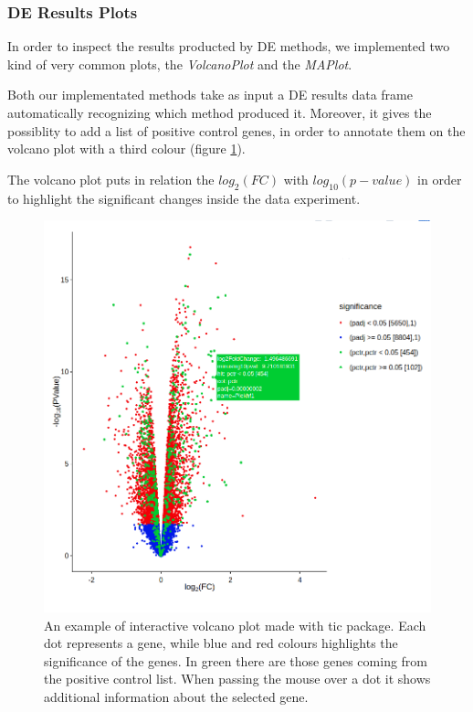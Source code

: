 \subsubsection{DE Results Plots}
In order to inspect the results producted by DE methods, we implemented two kind of very common plots, the \textit{VolcanoPlot} and the \textit{MAPlot}.

Both our implementated methods take as input a DE results data frame automatically recognizing which method produced it.
Moreover, it gives the possiblity to add a list of positive control genes, in order to annotate them on the volcano plot with a third colour (figure \ref{fig:ticorservolcano}).

The volcano plot puts in relation the $log_2(FC)$ with $log_{10}(p-value)$ in order to highlight the significant changes inside the data experiment.

\begin{figure}[H]
\includegraphics[width=\textwidth,height=\textheight,keepaspectratio]{img/ticorser/volcano_example.png}
\caption[ticorser volcano]{An example of interactive volcano plot made with \gls{tic} package. Each dot represents a gene, while blue and red colours highlights the significance of the genes. In green there are those genes coming from the positive control list. When passing the mouse over a dot it shows additional information about the selected gene.}
\label{fig:ticorservolcano}
\centering
\end{figure}

